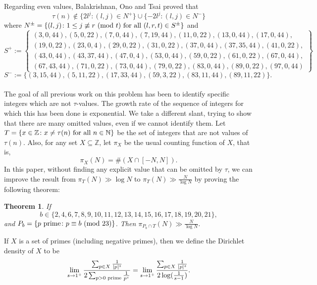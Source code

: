 \documentclass[12pt]{amsart}
\newtheorem{thm}{Theorem}[section]
\newcommand{\Z}{\mathbb{Z}}
\newcommand{\N}{\mathbb{N}}
\numberwithin{equation}{section}
\begin{document}
Regarding even values, Balakrishnan, Ono and Tsai \cite{BOT} proved that$$\tau(n)\notin\{2l^j\colon (l,j)\in N^+\}\cup\{-2l^j\colon (l,j)\in N^-\}$$where $N^\pm=\{(l,j)\colon 1\leq j\not\equiv r\textup{ (mod }t)\textup{ for all }(l,r,t)\in S^{\pm}\}$ and \begin{equation}
S^{+}:= \left\{ \begin{matrix} (3, 0, 44), (5,0,22), (7,0,44), (7,19,44), (11,0,22), (13, 0, 44), (17, 0, 44), \\ (19, 0, 22),  (23,0,4), (29,0,22), 
(31,0,22), (37,0,44), (37,35,44), (41,0,22),\\ (43,0,44), (43,37,44), (47,0,4), (53,0,44), (59, 0, 22), (61,0,22), (67, 0, 44), \\ (67,43,44),
(71,0,22), (73,0,44), (79,0,22), (83,0,44), (89,0,22), (97,0,44)
\end{matrix}
\right \}
\end{equation}
\begin{equation}
S^{-}:=\{(3,15, 44), (5, 11, 22), (17, 33, 44), (59, 3, 22), (83,11, 44), (89, 11, 22)\}.
\end{equation}\\
The goal of all previous work on this problem has been to identify specific integers which are not $\tau$-values. The growth rate of the sequence of integers for which this has been done is exponential. We take a different slant, trying to show that there are many omitted values, even if we cannot identify them. Let $T=\{x\in\Z\colon x\neq\tau(n)\textup{ for all }n\in\N\}$ be the set of integers that are not values of $\tau(n)$. Also, for any set $X\subseteq\Z$, let $\pi_X$ be the usual counting function of $X$, that is,  $$\pi_X(N)= \# ( X\cap[-N,N]).$$
In this paper, without finding any explicit value that can be omitted by $\tau$, we can improve the result from $\pi_T(N) \gg \log N$ to $\pi_T(N)\gg\frac{N}{\log N}$ by proving the following theorem:
\begin{thm}\label{T}
    If $$b\in\{2,4,6,7,8,9,10,11,12,13,14,15,16,17,18,19,20,21\},$$ and $P_b=\{p \textup{ prime}\colon p \equiv b \textup{ (mod 23)}\}$. Then $\pi_{P_b\cap T}(N) \gg \frac{N}{\log N}$. 
\end{thm}

If $X$ is a set of primes (including negative primes), then we define the Dirichlet density of $X$ to be $$\lim_{s\to 1^+}\frac{\sum_{p\in X}\frac{1}{|p|^s}}{2\sum_{p>0\textup{ prime}}\frac{1}{p^s}}=\lim_{s\to 1^+}\frac{\sum_{p\in X}\frac{1}{|p|^s}}{2\log(\frac{1}{s-1})}.$$ 
\end{document}
